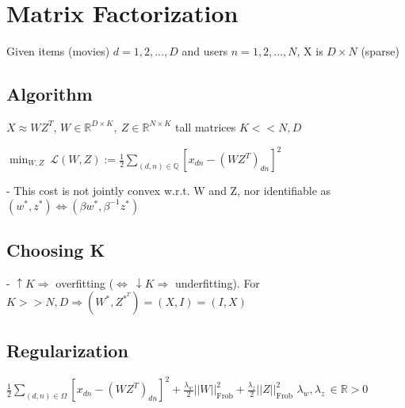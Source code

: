 \section{Matrix Factorization}
Given items (movies) $d=1, 2, . . . , D$ and users $n= 1, 2, . . . , N$, X is $D \times N$ (sparse)

\subsection*{Algorithm}

$X \approx WZ^T$, $W \in \mathbb{R}^{D \times K}, \ Z \in \mathbb{R}^{N \times K}$ tall matrices $K << N, D$

$\operatorname*{min}_{W,Z}~{\mathcal{L}}(W,Z):=\frac{1}{2}\sum_{(d,n)\in\mathbb{Q}} [x_{dn}-(WZ^T)_{dn}]^2$





- This cost is not jointly convex w.r.t. W and Z, nor identifiable as $(w^*, z^*) \Leftrightarrow (\beta w^*, \beta^{-1} z^*)$

\subsection*{Choosing K}

- $\uparrow K \Rightarrow$ overfitting ($\Leftrightarrow \ \downarrow K \Rightarrow$ underfitting). 
For $K >> N,D \Rightarrow (W^*, Z^{*^T}) = (X, I) = (I, X)$

\subsection*{Regularization}

$\frac{1}{2}\sum_{(d,n)\in\Omega}[x_{d n}-(W Z^{T})_{d n}]^{2}+\frac{\lambda_{w}}{2}||{W}||_{\mathrm{Frob}}^{2}+\frac{\lambda_{z}}{2}||{Z}||_{\mathrm{Frob}}^{2}$
$\lambda_{w},\lambda_{z}\, \in \mathbb{R} > 0$


